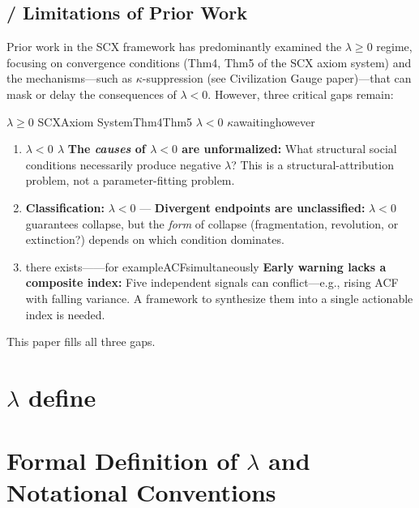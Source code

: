 \documentclass[11pt,a4paper]{article}
\theoremstyle{remark}
\newcommand{\coupling}{\kappa}
\newcommand{\lambdaparam}{\lambda}
\begin{document}
\subsection{ / Limitations of Prior Work}

Prior work in the SCX framework has predominantly examined the $\lambdaparam \geq 0$ regime,
focusing on convergence conditions (Thm4, Thm5 of the SCX axiom system) and the
mechanisms—such as $\coupling$-suppression (see Civilization Gauge paper)—that can
mask or delay the consequences of $\lambdaparam < 0$. However, three critical gaps remain:

 $\lambdaparam \geq 0$ 
SCXAxiom SystemThm4Thm5 $\lambdaparam < 0$ 
$\coupling$awaitinghowever

\begin{enumerate}
    \item \textbf{$\lambdaparam < 0$ \textit{}}
           $\lambdaparam$ 
          \hfill
          \textbf{The \textit{causes} of $\lambdaparam < 0$ are unformalized:}
          What structural social conditions necessarily produce negative $\lambdaparam$?
          This is a structural-attribution problem, not a parameter-fitting problem.

    \item \textbf{Classification:}
          $\lambdaparam < 0$ \textit{}
          —\hfill
          \textbf{Divergent endpoints are unclassified:}
          $\lambdaparam < 0$ guarantees collapse, but the \textit{form} of collapse
          (fragmentation, revolution, or extinction?) depends on which condition dominates.

    \item \textbf{}
          there exists——for exampleACFsimultaneously
          \hfill
          \textbf{Early warning lacks a composite index:}
          Five independent signals can conflict—e.g., rising ACF with falling variance.
          A framework to synthesize them into a single actionable index is needed.
\end{enumerate}



This paper fills all three gaps.

\section{$\lambdaparam$ define}
\section{Formal Definition of $\lambdaparam$ and Notational Conventions}
\end{document}
